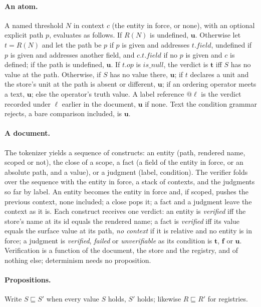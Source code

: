 \documentclass[11pt,a4paper]{article}
\begin{document}
\paragraph{An atom.} A named threshold $N$ in context $c$ (the entity in force, or none), with an optional explicit path $p$, evaluates as follows. If $R(N)$ is undefined, $\mathbf{u}$. Otherwise let $t=R(N)$ and let the path be $p$ if $p$ is given and addresses $t.\mathit{field}$, undefined if $p$ is given and addresses another field, and $c\texttt{.}t.\mathit{field}$ if no $p$ is given and $c$ is defined; if the path is undefined, $\mathbf{u}$. If $t.\mathit{op}$ is $\mathit{is\_null}$, the verdict is $\mathbf{t}$ iff $S$ has no value at the path. Otherwise, if $S$ has no value there, $\mathbf{u}$; if $t$ declares a unit and the store's unit at the path is absent or different, $\mathbf{u}$; if an ordering operator meets a text, $\mathbf{u}$; else the operator's truth value. A label reference $@\ell$ is the verdict recorded under $\ell$ earlier in the document, $\mathbf{u}$ if none. Text the condition grammar rejects, a bare comparison included, is $\mathbf{u}$.

\paragraph{A document.} The tokenizer yields a sequence of constructs: an entity (path, rendered name, scoped or not), the close of a scope, a fact (a field of the entity in force, or an absolute path, and a value), or a judgment (label, condition). The verifier folds over the sequence with the entity in force, a stack of contexts, and the judgments so far by label. An entity becomes the entity in force and, if scoped, pushes the previous context, none included; a close pops it; a fact and a judgment leave the context as it is. Each construct receives one verdict: an entity is \emph{verified} iff the store's name at its id equals the rendered name; a fact is \emph{verified} iff its value equals the surface value at its path, \emph{no context} if it is relative and no entity is in force; a judgment is \emph{verified}, \emph{failed} or \emph{unverifiable} as its condition is $\mathbf{t}$, $\mathbf{f}$ or $\mathbf{u}$. Verification is a function of the document, the store and the registry, and of nothing else; determinism needs no proposition.

\paragraph{Propositions.} Write $S \sqsubseteq S'$ when every value $S$ holds, $S'$ holds; likewise $R \sqsubseteq R'$ for registries.
\end{document}
